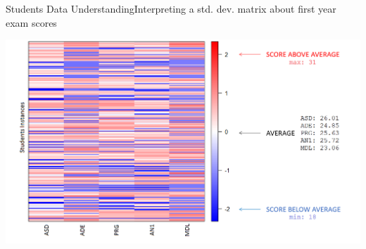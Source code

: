 \begin{frame}{Students Data Understanding}{Interpreting a std. dev. matrix about first year exam scores}

    \vspace{0.25cm}
    \noindent\begin{centering}
        \hspace{-1cm}\includegraphics[scale=0.38]{img3.png}
    \end{centering}

\end{frame}
